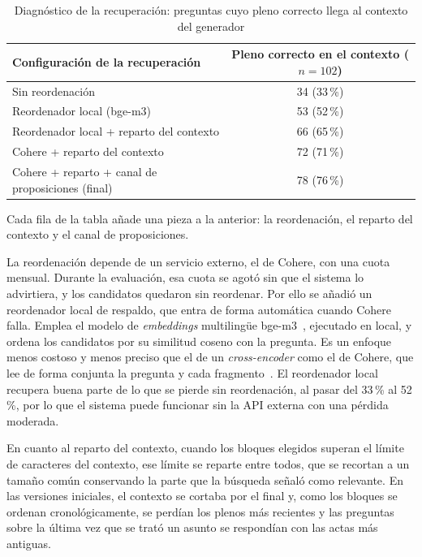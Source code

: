 \documentclass[11pt, a4paper]{report}
\begin{document}
	\begin{table}[H]
		\centering
		\begin{tabularx}{\linewidth}{|>{\raggedright\arraybackslash}X|c|}
			\hline
			\rowcolor{tabla-header}
			\textbf{Configuración de la recuperación} & \textbf{Pleno correcto en el contexto ($n=102$)} \\
			\hline
			Sin reordenación & 34 (33\,\%) \\
			\hline
			\rowcolor{fila-alterna}
			Reordenador local (bge-m3) & 53 (52\,\%) \\
			\hline
			Reordenador local + reparto del contexto & 66 (65\,\%) \\
			\hline
			\rowcolor{fila-alterna}
			Cohere + reparto del contexto & 72 (71\,\%) \\
			\hline
			Cohere + reparto + canal de proposiciones (final) & 78 (76\,\%) \\
			\hline
		\end{tabularx}
		\caption{Diagnóstico de la recuperación: preguntas cuyo pleno correcto llega al contexto del generador}
		\label{tab:diag-recuperacion}
	\end{table}

	Cada fila de la tabla añade una pieza a la anterior: la reordenación, el
	reparto del contexto y el canal de proposiciones.

	La reordenación depende de un servicio externo, el de Cohere, con una cuota
	mensual. Durante la evaluación, esa cuota se agotó sin
	que el sistema lo advirtiera, y los candidatos quedaron sin reordenar. Por
	ello se añadió un reordenador local de respaldo, que entra de forma automática
	cuando Cohere falla. Emplea el modelo de \textit{embeddings} multilingüe
	bge-m3~\cite{chen2024-bge-m3}, ejecutado en local, y ordena los candidatos por
	su similitud coseno con la pregunta. Es un enfoque menos costoso y menos
	preciso que el de un \textit{cross-encoder} como el de Cohere, que lee de
	forma conjunta la pregunta y cada
	fragmento~\cite{nogueira2019-bert-rerank}. El reordenador local recupera buena
	parte de lo que se pierde sin reordenación, al pasar del 33\,\% al 52\,\%, por lo
	que el sistema puede funcionar sin la API externa con una pérdida moderada.

	En cuanto al reparto del contexto, cuando los bloques elegidos
	superan el límite de caracteres del contexto, ese límite se reparte entre
	todos, que se recortan a un tamaño común conservando la parte que la búsqueda
	señaló como relevante. En las versiones iniciales, el contexto se cortaba por el final y, como los
	bloques se ordenan cronológicamente, se perdían los plenos más recientes y las
	preguntas sobre la última vez que se trató un asunto se respondían con las
	actas más antiguas.
\end{document}
